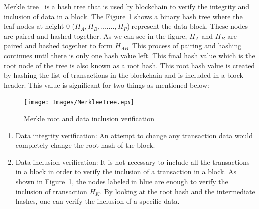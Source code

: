 Merkle tree~\cite{becker2008merkle} is a hash tree that is used by blockchain
to verify the integrity and inclusion of data in a block. The
Figure~\ref{fig:merkleTree} shows a binary hash tree where the leaf nodes at
height 0 ($H_{A}, H_{B}, ......., H_{P}$) represent the data block. These
nodes are paired and hashed together. As we can see in the figure, $H_A$ and
$H_{B}$ are paired and hashed together to form $H_{AB}$. This process of
pairing and hashing continues until there is only one hash value left. This
final hash value which is the root node of the tree is also known as a root
hash.  This root hash value is created by hashing the list of transactions in
the blockchain and is included in a block header. 
This value is significant for two things as mentioned
below:  
\begin{figure}
	\begin{center}
		\texttt{[image: Images/MerkleeTree.eps]}
		\caption{Merkle root and data inclusion verification}
		\label{fig:merkleTree}
	\end{center}
\end{figure}
\begin{enumerate}
	\item Data integrity verification: An attempt to change any transaction data
		would completely change the root hash of the block.  
	\item Data inclusion verification: It is not necessary to include all the
		transactions in a block in order to verify the inclusion of a
		transaction in a block. As shown in Figure~\ref{fig:merkleTree}, the
		nodes labeled in blue are enough to verify the inclusion of transaction
		$H_{K}$. By looking at the root hash and the intermediate hashes, one
		can verify the inclusion of a specific data.
\end{enumerate}
